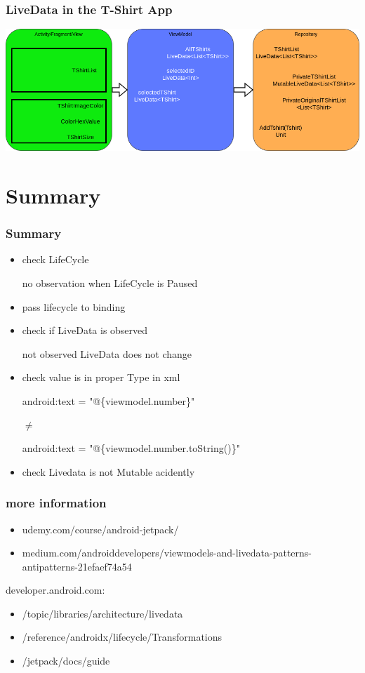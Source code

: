 \documentclass{beamer}
\begin{document}
	\begin{frame}
		\frametitle{LiveData in the T-Shirt App}
		\includegraphics[width=1\textwidth]{TShirtAppDetailView.png}
	\end{frame}
	
	\section[Summary]{Summary}
	\begin{frame}
		\frametitle{Summary}
		\begin{itemize}
		\item check LifeCycle
		
		no observation when LifeCycle is Paused
		\item pass lifecycle to binding
		\item check if LiveData is observed
		
		not observed LiveData does not change
		\item check value is in proper Type in xml
		
		android:text = "@\{viewmodel.number\}"
		
			$\neq$
		
		android:text = "@\{viewmodel.number.toString()\}" 
		\item check Livedata is not Mutable acidently
		
		\end{itemize}
	\end{frame}
	
	\begin{frame}
		\frametitle{more information}
		\begin{itemize}
			\item udemy.com/course/android-jetpack/
			\item medium.com/androiddevelopers/viewmodels-and-livedata-patterns-antipatterns-21efaef74a54
		\end{itemize}
		developer.android.com:
		\begin{itemize}
			\item /topic/libraries/architecture/livedata
			\item /reference/androidx/lifecycle/Transformations
			\item /jetpack/docs/guide
		\end{itemize}
	\end{frame}
	
\end{document}
